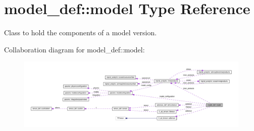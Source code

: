 \hypertarget{structmodel__def_1_1model}{}\section{model\+\_\+def\+:\+:model Type Reference}
\label{structmodel__def_1_1model}


Class to hold the components of a model version.  




Collaboration diagram for model\+\_\+def\+:\+:model\+:\nopagebreak
\begin{figure}[H]
\begin{center}
\leavevmode
\includegraphics[width=350pt]{structmodel__def_1_1model__coll__graph}
\end{center}
\end{figure}
